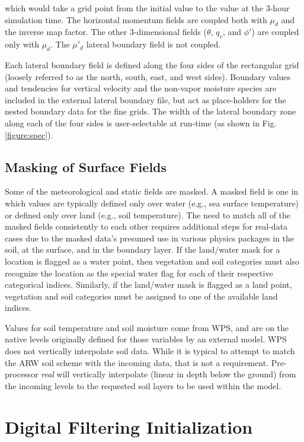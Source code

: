 \noindent which would take a grid point from the initial value to the value at the 3-hour simulation time. 
The horizontal momentum fields are coupled both with  $\mu_d$ and the inverse map factor.  The 
other 3-dimensional fields ($\theta$, $q_v$, and $\phi'$) are coupled only with $\mu_d$.
The $\mu'_d$ lateral boundary field is not coupled.

Each lateral boundary field
is defined along the four sides of the 
rectangular grid (loosely referred to as the north, south, east, and west sides).  
Boundary values and tendencies for vertical velocity and the non-vapor moisture species are included
in the external lateral boundary file, but act as
place-holders for the nested boundary data for the fine grids.
The width of the lateral
boundary zone along each of the four sides is user-selectable at run-time
(as shown in Fig. \ref{figure:spec}).

\subsection{Masking of Surface Fields}

Some of the meteorological and static fields are masked.  A masked field is one in which
values are typically defined only over water (e.g., sea surface temperature) or defined
only over land (e.g., soil temperature).
The need to match all of the masked fields consistently to each other requires additional steps
for real-data cases due to the masked data's presumed use in various physics packages in the soil, 
at the surface, and in the boundary layer.
If the land/water
mask for a location is flagged as a water point, then vegetation and soil categories must also
recognize the location as the special water flag for each of their respective categorical indices.  
Similarly, if the land/water mask is flagged as a land point, vegetation and soil
categories must be assigned to one of the available land indices.

Values for soil temperature and soil moisture come from WPS, and are on the 
native levels originally defined for those variables
by an external model.  WPS does not vertically interpolate
soil data.  While it is typical to attempt to match the ARW soil scheme with
the incoming data, that is not a requirement.  Pre-processor {\it real} will vertically interpolate 
(linear in depth below the ground) from the incoming levels to the requested soil layers to be
used within the model.

\section{Digital Filtering Initialization}

